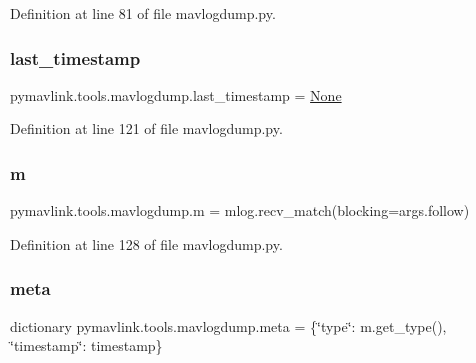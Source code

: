 Definition at line 81 of file mavlogdump.\+py.

\mbox{\label{namespacepymavlink_1_1tools_1_1mavlogdump_a53ff4c2645da546179bd721de494e04a}} 
\subsubsection{\texorpdfstring{last\_timestamp}{last\_timestamp}}
{\footnotesize\ttfamily pymavlink.\+tools.\+mavlogdump.\+last\+\_\+timestamp = \mbox{\hyperlink{namespacepymavlink_1_1tools_1_1mavlogdump_a4f907ac5c5d06d13d8020f0969229a7e}{None}}}



Definition at line 121 of file mavlogdump.\+py.

\mbox{\label{namespacepymavlink_1_1tools_1_1mavlogdump_ad6f8303b7b10c5216189a5b97e662b84}} 
\subsubsection{\texorpdfstring{m}{m}}
{\footnotesize\ttfamily pymavlink.\+tools.\+mavlogdump.\+m = mlog.\+recv\+\_\+match(blocking=args.\+follow)}



Definition at line 128 of file mavlogdump.\+py.

\mbox{\label{namespacepymavlink_1_1tools_1_1mavlogdump_ad3723a3a312a13fed34c390355d09a3d}} 
\subsubsection{\texorpdfstring{meta}{meta}}
{\footnotesize\ttfamily dictionary pymavlink.\+tools.\+mavlogdump.\+meta = \{\char`\"{}type\char`\"{}\+: m.\+get\+\_\+type(), \char`\"{}timestamp\char`\"{}\+: timestamp\}}



